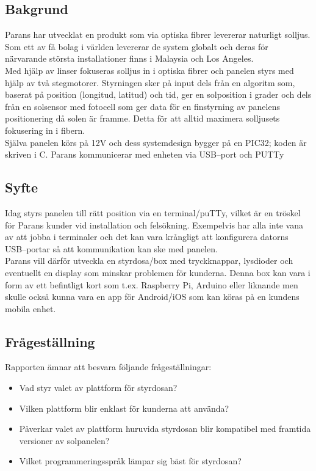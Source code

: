 \documentclass{article}
\begin{document}
        \subsection{Bakgrund} %
        \label{sub:bakgrund}
            Parans har utvecklat en produkt som via optiska fibrer levererar naturligt solljus. Som ett av få bolag i världen levererar de system globalt och deras för närvarande största installationer finns i Malaysia och Los Angeles.\\

            \noindent Med hjälp av linser fokuseras solljus in i optiska fibrer och panelen styrs med hjälp av två stegmotorer. Styrningen sker på input dels från en algoritm som, baserat på position (longitud, latitud) och tid, ger en solposition i grader och dels från en solsensor med fotocell som ger data för en finstyrning av panelens positionering då solen är framme. Detta för att alltid maximera solljusets fokusering in i fibern.\\

            \noindent Själva panelen körs på 12V och dess systemdesign bygger på en PIC32; koden är skriven i C. Parans kommunicerar med enheten via USB--port och PUTTy
        
        \subsection{Syfte} %
        \label{sub:syfte}
            Idag styrs panelen till rätt position via en terminal/puTTy, vilket är en tröskel för Parans kunder vid installation och felsökning.  Exempelvis har alla inte vana av att jobba i terminaler och det kan vara krångligt att konfigurera datorns USB--portar så att kommunikation kan ske med panelen. \\

            \noindent Parans vill därför utveckla en styrdosa/box med tryckknappar, lysdioder och eventuellt en display som minskar problemen för kunderna. Denna box kan vara i form av ett befintligt kort som t.ex. Raspberry Pi, Arduino eller liknande men skulle också kunna vara en app för Android/iOS som kan köras på en kundens mobila enhet.

        \subsection{Frågeställning} %
        \label{sub:fragestallning}
        Rapporten ämnar att besvara följande frågeställningar:\\
        \begin{itemize}
            \item Vad styr valet av plattform för styrdosan?
            \item Vilken plattform blir enklast för kunderna att använda?
            \item Påverkar valet av plattform huruvida styrdosan blir kompatibel med framtida versioner av solpanelen?
            \item Vilket programmeringsspråk lämpar sig bäst för styrdosan?
        \end{itemize}   
        
\end{document}
